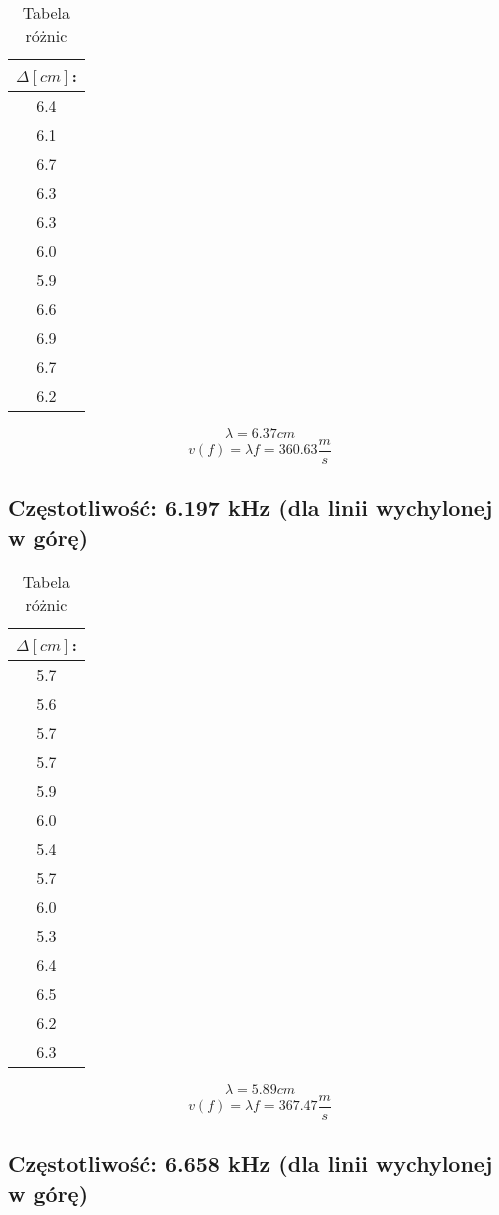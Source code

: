 \documentclass[polish,a4paper]{article}
\begin{document}
\begin{table}[H]
\centering
\begin{tabular}{|c|}
\hline
$\Delta [cm]$:\\
\hline 
6.4 \\
6.1 \\
6.7 \\
6.3 \\
6.3 \\
6.0 \\
5.9 \\
6.6 \\
6.9 \\
6.7 \\
6.2 \\
\hline
\end{tabular}
\caption{Tabela różnic}
\end{table}

$$\lambda = 6.37 cm$$
$$v(f) = \lambda f = 360.63 \frac{m}{s}$$

\subsection{Częstotliwość: 6.197 kHz (dla linii wychylonej w górę)}

\begin{table}[H]
\centering
\begin{tabular}{|c|}
\hline
$\Delta [cm]$:\\
\hline 
5.7 \\
5.6 \\
5.7 \\
5.7 \\
5.9 \\
6.0 \\
5.4 \\
5.7 \\
6.0 \\
5.3 \\
6.4 \\
6.5 \\
6.2 \\
6.3 \\
\hline
\end{tabular}
\caption{Tabela różnic}
\end{table}

$$\lambda = 5.89 cm$$
$$v(f) = \lambda f = 367.47 \frac{m}{s}$$

\subsection{Częstotliwość: 6.658 kHz (dla linii wychylonej w górę)}
\end{document}
